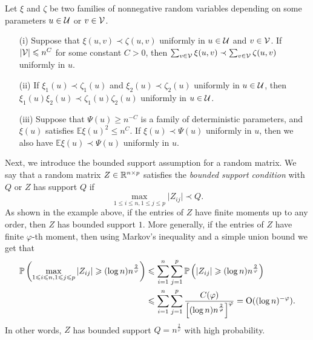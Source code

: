 \begin{fact}\label{lem_stodomin}
Let $\xi$ and $\zeta$ be two families of nonnegative random variables depending on some parameters $u\in \cal U$ or $v\in \cal V$.
\begin{itemize}
\item[(i)] Suppose that $\xi (u,v)\prec \zeta(u,v)$ uniformly in $u\in \cal U$ and $v\in \cal V$. If $|\cal V|\le n^C$ for some constant $C>0$, then $\sum_{v\in \cal V} \xi(u,v) \prec \sum_{v\in \cal V} \zeta(u,v)$ uniformly in $u$.

\item[(ii)] If $\xi_1 (u)\prec \zeta_1(u)$ and $\xi_2 (u)\prec  \zeta_2(u)$ uniformly in $u\in \cal U$, then $\xi_1(u)\xi_2(u) \prec \zeta_1(u) \zeta_2(u)$ uniformly in $u\in \cal U$.

\item[(iii)] Suppose that $\Psi(u)\ge n^{-C}$ is a family of deterministic parameters, and $\xi(u)$ satisfies $\mathbb E\xi(u)^2 \le n^C$. If $\xi(u)\prec \Psi(u)$ uniformly in $u$, then we also have $\mathbb E\xi(u) \prec \Psi(u)$ uniformly in $u$.
\end{itemize}
\end{fact}


Next, we introduce the bounded support assumption for a random matrix.
We say that a random matrix $Z \in\real^{n \times p}$ satisfies the {\it{bounded support condition}} with $Q$ or $Z$ has support $Q$ if
\begin{equation}
	\max_{1\le i \le n, 1 \le j \le p}\vert Z_{i j} \vert \prec Q. \label{eq_support}
\end{equation}
As shown in the example above, if the entries of $Z$ have finite moments up to any order, then $Z$ has bounded support $1$.
More generally, if the entries of $Z$ have finite $\varphi$-th moment, then using Markov's inequality and a simple union bound we get that %
\begin{align}
	\P\left(\max_{1\le i\le n, 1\le j \le p}|Z_{i  j}|\ge (\log n) n^{\frac{2}{\varphi}}\right) &\le \sum_{i=1}^n \sum_{j=1}^p \P\left(|Z_{i j}|\ge (\log n) n^{\frac{2}{\varphi}}\right)  \nonumber\\
	&\le \sum_{i=1}^n \sum_{j=1}^p \frac{C(\varphi)}{\left[(\log n) n^{\frac{2}{\varphi}}\right]^\varphi} = \OO((\log n)^{-\varphi}).\label{Ptrunc}
	\end{align}
In other words, $Z$ has bounded support $Q=n^{\frac{2}{\varphi}}$ with high probability.

